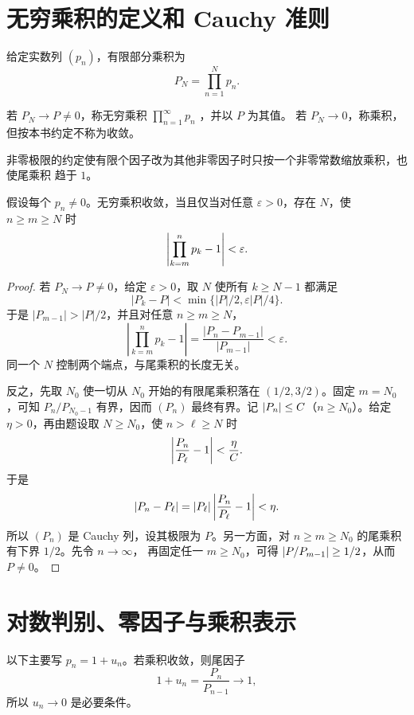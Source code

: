 \section{无穷乘积的定义和 Cauchy 准则}

给定实数列 \((p_n)\)，有限部分乘积为
\[
 P_N=\prod_{n=1}^Np_n.
\]

\begin{definition}
若 \(P_N\to P\ne0\)，称无穷乘积
\(\prod_{n=1}^\infty p_n\) ，并以 \(P\) 为其值。
若 \(P_N\to0\)，称乘积，但按本书约定不称为收敛。
\end{definition}

非零极限的约定使有限个因子改为其他非零因子时只按一个非零常数缩放乘积，也使尾乘积
趋于 \(1\)。

\begin{theorem}
\label{thm:infinite-product-cauchy}
假设每个 \(p_n\ne0\)。无穷乘积收敛，当且仅当对任意
\(\varepsilon>0\)，存在 \(N\)，使 \(n\ge m\ge N\) 时
\[
 \left|\prod_{k=m}^n p_k-1\right|<\varepsilon.
\]
\end{theorem}

\begin{proof}
若 \(P_N\to P\ne0\)，给定 \(\varepsilon>0\)，取 \(N\) 使所有
\(k\ge N-1\) 都满足
\[
 |P_k-P|<\min\{|P|/2,\varepsilon|P|/4\}.
\]
于是 \(|P_{m-1}|>|P|/2\)，并且对任意 \(n\ge m\ge N\)，
\[
 \left|\prod_{k=m}^np_k-1\right|
 =\frac{|P_n-P_{m-1}|}{|P_{m-1}|}<\varepsilon.
\]
同一个 \(N\) 控制两个端点，与尾乘积的长度无关。

反之，先取 \(N_0\) 使一切从 \(N_0\) 开始的有限尾乘积落在
\((1/2,3/2)\)。固定 \(m=N_0\)，可知
\(P_n/P_{N_0-1}\) 有界，因而 \((P_n)\) 最终有界。记
\(\left|P_n\right|\le C\)（\(n\ge N_0\)）。给定 \(\eta>0\)，再由题设取
\(N\ge N_0\)，使 \(n>\ell\ge N\) 时
\[
 \left|\frac{P_n}{P_\ell}-1\right|<\frac{\eta}{C}.
\]
于是
\[
 \left|P_n-P_\ell\right|
 =\left|P_\ell\right|\left|\frac{P_n}{P_\ell}-1\right|<\eta.
\]
所以 \((P_n)\) 是 Cauchy 列，设其极限为 \(P\)。另一方面，对
\(n\ge m\ge N_0\) 的尾乘积有下界 \(1/2\)。先令 \(n\to\infty\)，
再固定任一 \(m\ge N_0\)，可得
\(\left|P/P_{m-1}\right|\ge1/2\)，从而 \(P\ne0\)。
\end{proof}

\section{对数判别、零因子与乘积表示}

以下主要写 \(p_n=1+u_n\)。若乘积收敛，则尾因子
\[
 1+u_n=\frac{P_n}{P_{n-1}}\to1,
\]
所以 \(u_n\to0\) 是必要条件。

